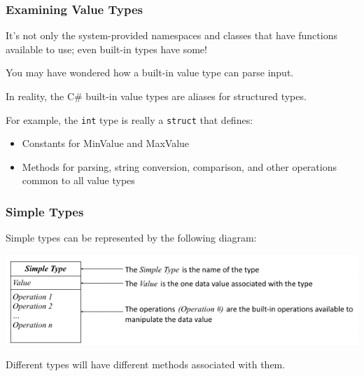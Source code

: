 \begin{frame}
\frametitle{Examining Value Types}

It's not only the system-provided namespaces and classes that have functions available to use; even built-in types have some!

You may have wondered how a built-in value type can parse input.

In reality, the C\# built-in value types are aliases for structured types.

For example, the \texttt{int} type is really a \texttt{struct} that defines:
\begin{itemize}
	\item Constants for MinValue and MaxValue
	\item Methods for parsing, string conversion, comparison, and other operations common to all value types 
\end{itemize}

\end{frame}

\begin{frame}
\frametitle{Simple Types}
Simple types can be represented by the following diagram:

\begin{center}
	\includegraphics[width=\textwidth]{images/simpletype.png}
\end{center}

Different types will have different methods associated with them.

\end{frame}




